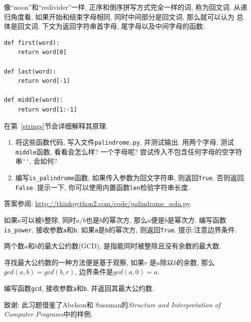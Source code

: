 \documentclass[10pt]{book}
\begin{document}
\begin{exercise}
\label{palindrome}

像``noon''和``redivider''一样, 正序和倒序拼写方式完全一样的词, 称为回文词. 
从递归角度看, 如果开始和结束字母相同, 同时中间部分是回文词, 那么就可以认为
总体是回文词. 
下文为返回字符串首字母, 尾字母以及中间字母的函数:

\begin{verbatim}
def first(word):
    return word[0]

def last(word):
    return word[-1]

def middle(word):
    return word[1:-1]
\end{verbatim}
%

在第~\ref{strings}节会详细解释其原理.

\begin{enumerate}

\item 将这些函数代码, 写入文件{\tt palindrome.py}, 并测试输出. 
用两个字母, 测试{\tt middle}函数, 看看会怎么样? 一个字母呢?  
尝试传入不包含任何字母的空字符串\verb"''",  会如何?

\item 编写\verb"is_palindrome"函数, 如果传入参数为回文字符串, 
则返回{\tt True}, 否则返回{\tt False}. 
提示一下, 你可以使用内置函数{\tt len}检验字符串长度. 

\end{enumerate}

答案参阅: \url{http://thinkpython2.com/code/palindrome_soln.py}.

\end{exercise}

\begin{exercise}

如果$a$可以被$b$整除, 同时$a/b$也是$b$的幂次方, 那么$a$便是$b$是幂次方. 
编写函数\verb"is_power", 
接收参数{\tt a}和{\tt b}, 如果{\tt a}是{\tt b}的幂次方, 则返回{\tt True}. 
提示:注意边界条件. 

\end{exercise}


\begin{exercise}

两个数$a$和$b$的最大公约数(GCD), 是指能同时被整除且没有余数的最大数. 

寻找最大公约数的一种方法便是基于观察, 如果$r$ 是$a$除以$b$的余数, 
那么$gcd(a, b) = gcd(b, r)$, 边界条件是$gcd(a, 0) = a$.

编写函数\verb"gcd", 接收参数{\tt a}和{\tt b}, 并返回其最大公约数. 


致谢: 此习题借鉴了Abelson和
Sussman的{\em Structure and Interpretation of Computer Programs}中的样例.

\end{exercise}
\end{document}
